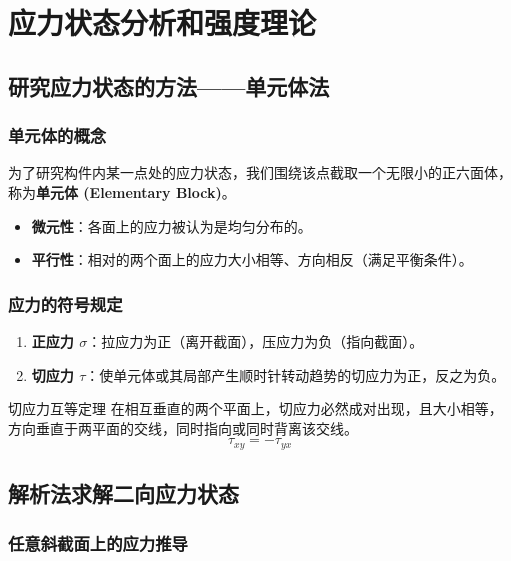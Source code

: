 \chapter{应力状态分析和强度理论}


\section{研究应力状态的方法——单元体法}

\subsection{单元体的概念}
为了研究构件内某一点处的应力状态，我们围绕该点截取一个无限小的正六面体，称为\textbf{单元体 (Elementary Block)}。
\begin{itemize}
    \item \textbf{微元性}：各面上的应力被认为是均匀分布的。
    \item \textbf{平行性}：相对的两个面上的应力大小相等、方向相反（满足平衡条件）。
\end{itemize}

\subsection{应力的符号规定}
\begin{enumerate}
    \item \textbf{正应力 $\sigma$}：拉应力为正（离开截面），压应力为负（指向截面）。
    \item \textbf{切应力 $\tau$}：使单元体或其局部产生顺时针转动趋势的切应力为正，反之为负。
\end{enumerate}

\begin{myTheorem}{切应力互等定理}
    在相互垂直的两个平面上，切应力必然成对出现，且大小相等，方向垂直于两平面的交线，同时指向或同时背离该交线。
    \[
    \tau_{xy} = -\tau_{yx}
    \]
\end{myTheorem}

\section{解析法求解二向应力状态}

\subsection{任意斜截面上的应力推导}

